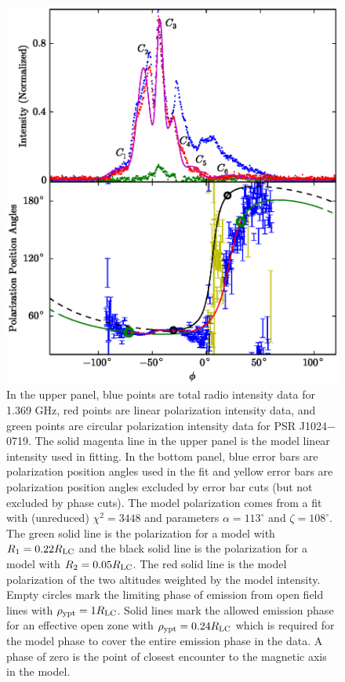 \begin{figure}[htbp]
\begin{center}
\includegraphics[scale=.8]{chapters/applicationOfNumericalModel/figures/intAndPAJ1024alpha113zeta108.eps}
\caption[Intensity and polarization data for PSR J1024$-$0719 overlaid with model]{\label{fig:PlotJ1024intPA}
In the upper panel, blue points are total radio intensity data for 1.369 GHz, red points are linear polarization intensity data,
and green points are circular polarization intensity data for PSR J1024$-$0719.  The solid magenta line in the upper panel is
the model linear intensity used in fitting.  In the bottom panel, blue error bars are polarization position angles
used in the fit and yellow error bars are polarization position angles excluded by error bar cuts (but not 
excluded by phase cuts).
The model polarization comes from
a fit with (unreduced) $\chi^2=3448$ and parameters $\alpha=113^{\circ}$ and $\zeta=108^{\circ}$.  The green solid line is the polarization for
a model with $R_{1}=0.22R_{\rm{LC}}$ and the black solid line is the polarization for 
a model with $R_{2}=0.05R_{\rm{LC}}$.  The red solid line is the model
polarization of the two altitudes weighted by the model intensity. Empty circles mark the limiting phase of emission from
open field lines with $\rho_{\rm{ypt}}=1R_{\rm{LC}}$.  
Solid lines mark the allowed emission phase for an effective open zone with $\rho_{\rm{ypt}}=0.24R_{\rm{LC}}$ which is
required for the model phase to cover the entire emission phase in the data.
A phase of zero is the point
of closest encounter to the magnetic axis in the model.
}
\end{center}
\end{figure}


